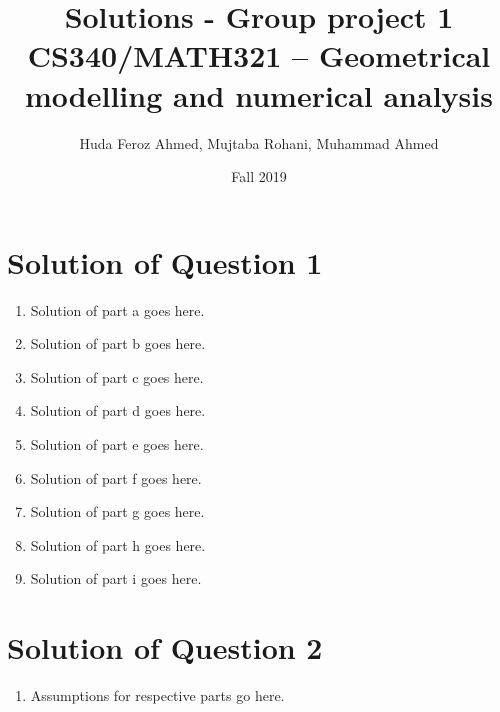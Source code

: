 \documentclass[a4paper, 11pt]{article}
\title{Solutions - Group project 1\\CS340/MATH321 -- Geometrical modelling and numerical analysis}
\date{Fall 2019}
\author{Huda Feroz Ahmed, Mujtaba Rohani, Muhammad Ahmed}
\begin{document}
\maketitle  
\setlength{\parskip}{10pt}
\setlength{\parindent}{0pt}

\section*{Solution of Question 1}
    
\begin{enumerate}[label=\alph*.]
    \item
    Solution of part a goes here.
    
    \item
    Solution of part b goes here.
    
    \item
    Solution of part c goes here.
    
    \item
    Solution of part d goes here.
    
    \item
    Solution of part e goes here.
    
    \item
    Solution of part f goes here.
    
    \item
    Solution of part g goes here.
    
    \item
    Solution of part h goes here.
    
    \item
    Solution of part i goes here.
    
\end{enumerate}

\section*{Solution of Question 2}
    
\begin{enumerate}[label=\alph*.]
    \item
    Assumptions for respective parts go here.
    
\end{enumerate}
\end{document}
